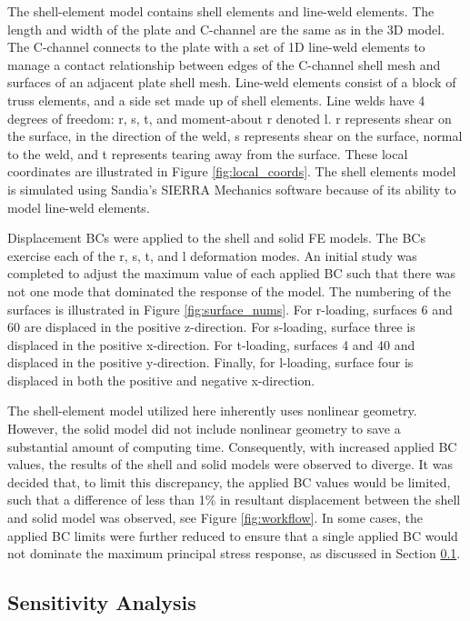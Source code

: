 The shell-element model contains shell elements and line-weld elements. The
length and width of the plate and C-channel are the same as in the 3D model.
The C-channel connects to the plate with a set of 1D line-weld elements to
manage a contact relationship between edges of the C-channel shell mesh and
surfaces of an adjacent plate shell mesh. Line-weld elements consist of a block
of truss elements, and a side set made up of shell elements. Line welds have 4
degrees of freedom: r, s, t, and moment-about r denoted l. r represents shear on
the surface, in the direction of the weld, s represents shear on the surface,
normal to the weld, and t represents tearing away from the surface. These local
coordinates are illustrated in Figure \ref{fig:local_coords}. The shell elements
model is simulated using Sandia’s SIERRA Mechanics software \cite{osti_1433781}
because of its ability to model line-weld elements.

Displacement BCs were applied to the shell and solid FE models.  The BCs
exercise each of the r, s, t, and l deformation modes.  An initial study was
completed to adjust the maximum value of each applied BC such that there was not
one mode that dominated the response of the model.  The numbering of the
surfaces is illustrated in Figure \ref{fig:surface_nums}. For r-loading,
surfaces 6 and 60 are displaced in the positive z-direction. For s-loading,
surface three is displaced in the positive x-direction. For t-loading, surfaces
4 and 40 and displaced in the positive y-direction. Finally, for l-loading, surface
four is displaced in both the positive and negative x-direction. 

The shell-element model utilized here inherently uses nonlinear geometry. However, the solid model did not include nonlinear geometry to save a substantial amount of computing time. Consequently, with increased applied BC values, the
results of the shell and solid models were observed to diverge.  It was decided
that, to limit this discrepancy, the applied BC values would be limited, such
that a difference of less than 1\% in resultant displacement between the shell
and solid model was observed, see Figure \ref{fig:workflow}.  In some cases, the
applied BC limits were further reduced to ensure that a single applied BC would
not dominate the maximum principal stress response, as discussed in Section
\ref{sensitivity_analysis}.

\subsection{Sensitivity Analysis} \label{sensitivity_analysis}

